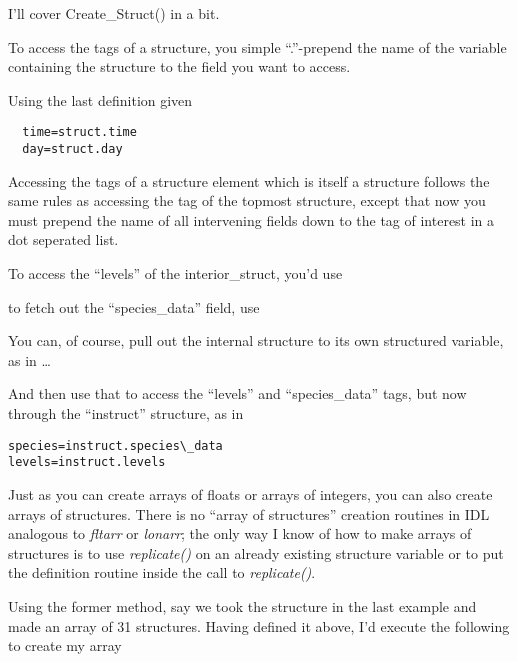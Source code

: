  I'll cover Create\_Struct() in a bit.


\ei

To access the tags of a structure, you simple ``.''-prepend the name of the
variable containing the structure to the field you want to access.

Using the last definition given

\begin{IDLExample}
\begin{verbatim}
  time=struct.time
  day=struct.day
\end{verbatim}
\end{IDLExample}



Accessing the tags of a structure element which is itself a structure
follows the same rules as accessing the tag of the topmost structure,
except that now you must prepend the name of all intervening fields
down to the tag of interest in a dot seperated list.

To access the ``levels'' of the interior\_struct, you'd use


to fetch out the ``species\_data'' field, use


You can, of course, pull out the internal structure to its own
structured variable, as in \ldots


And then use that to access the ``levels'' and ``species\_data'' tags,
but now through the ``instruct'' structure, as in


\begin{IDLExample}
\begin{verbatim}
species=instruct.species\_data
levels=instruct.levels
\end{verbatim}
\end{IDLExample}



Just as you can create arrays of floats or arrays of integers, you can
also create arrays of structures. There is no ``array of structures''
creation routines in IDL analogous to \textit{fltarr} or
\textit{lonarr}; the only way I know of how to make arrays of
structures is to use \textit{replicate()} on an already existing
structure variable or to put the definition routine inside the call to
\textit{replicate()}.

Using the former method, say we took the structure in the last example
and made an array of 31 structures. Having defined it above, I'd
execute the following to create my array

